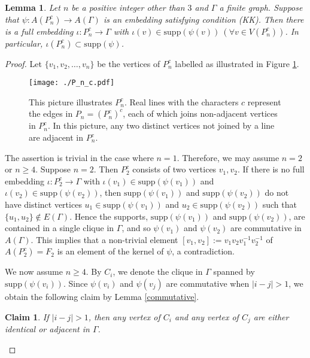 \documentclass{amsart}
\theoremstyle{definition}
\theoremstyle{plain}
\newtheorem{lemma}[definition]{Lemma}
\newtheorem{claim}[definition]{Claim}
\numberwithin{equation}{section}
\begin{document}
\begin{lemma}
Let $n$ be a positive integer other than $3$ and $\Gamma$ a finite graph. 
Suppose that $\psi \colon A(P_n^c) \rightarrow A(\Gamma)$ is an embedding satisfying condition (KK). 
Then there is a full embedding $\iota \colon P_n^c \rightarrow \Gamma$ with $\iota(v) \in \mathrm{supp}(\psi(v)) \ (\forall v \in V(P_n^c))$. 
In particular, $\iota(P_n^c) \subset \mathrm{supp}(\psi)$. 
\label{one-component-anti-path}
\end{lemma}
\begin{proof}
Let $\{v_1, v_2, \ldots, v_n \}$ be the vertices of $P_n^c$ labelled as illustrated in Figure \ref{label_P_n_c}. 
\begin{figure}
\centering
\texttt{[image: ./P\_n\_c.pdf]}
\caption{This picture illustrates $P_n^c$. 
Real lines with the characters $c$ represent the edges in $P_n = (P_n^c)^c$, each of which joins non-adjacent vertices in $P_n^c$. In this picture, any two distinct vertices not joined by a line are adjacent in $P_n^c$. }
\label{label_P_n_c}
\end{figure}

The assertion is trivial in the case where $n=1$. 
Therefore, we may assume $n = 2$ or $n \geq 4$. 
Suppose $n=2$. 
Then $P_2^c$ consists of two vertices $v_1 , v_2$. 
If there is no full embedding $\iota \colon P_2^c \rightarrow \Gamma$ with $\iota(v_1) \in \mathrm{supp}(\psi(v_1))$ and $\iota(v_2) \in \mathrm{supp}(\psi(v_2))$, then $\mathrm{supp}(\psi(v_1))$ and $\mathrm{supp}(\psi(v_2))$ do not have distinct vertices $u_1 \in \mathrm{supp}(\psi(v_1))$ and $u_2 \in \mathrm{supp}(\psi(v_2))$ such that $\{ u_1 , u_2 \} \not\in E(\Gamma)$. 
Hence the supports, $\mathrm{supp}(\psi(v_1))$ and $\mathrm{supp}(\psi(v_2))$, are contained in a single clique in $\Gamma$, and so $\psi(v_1)$ and $\psi(v_2)$ are commutative in $A(\Gamma)$. 
This implies that a non-trivial element $[v_1, v_2]:= v_1 v_2 v_1^{-1} v_2^{-1}$ of $A(P_2^c)=F_2$ is an element of the kernel of $\psi$, a contradiction. 

We now assume $n \geq 4$. 
By $C_{i}$, we denote the clique in $\Gamma$ spanned by $\mathrm{supp}(\psi(v_i))$. 
Since $\psi(v_i)$ and $\psi(v_j)$ are commutative when  $|i-j| > 1$, we obtain the following claim by Lemma \ref{commutative}. 

\begin{claim}
If $|i -j| > 1$, then any vertex of $C_i$ and any vertex of $C_j$ are either identical or adjacent in $\Gamma$. 
\label{claim-1}
\end{claim}


\end{proof}
\end{document}
